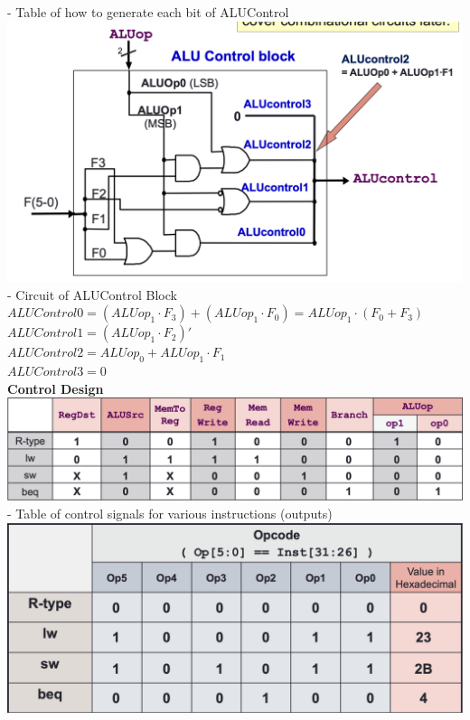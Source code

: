 \documentclass[10pt, a4paper]{article}
\begin{document}
\begin{multicols*}{3}
		- Table of how to generate each bit of ALUControl\\
		\includegraphics[scale=.25]{./assets/ALUControlBlockCircuit}\\
		- Circuit of ALUControl Block\\
		$ALUControl0 = (ALUop_1 \cdot F_3) + (ALUop_1 \cdot F_0) = ALUop_1 \cdot (F_0 + F_3)$\\
		$ALUControl1 = (ALUop_1 \cdot F_2)'$\\
		$ALUControl2 = ALUop_0 + ALUop_1 \cdot F_1$\\
		$ALUControl3 = 0$\\
		\textbf{Control Design}\\
		\includegraphics[scale=.25]{./assets/controlTable}\\
		- Table of control signals for various instructions (outputs)\\
		\includegraphics[scale=.25]{./assets/opcodeTable}\\

\end{multicols*}
\end{document}
